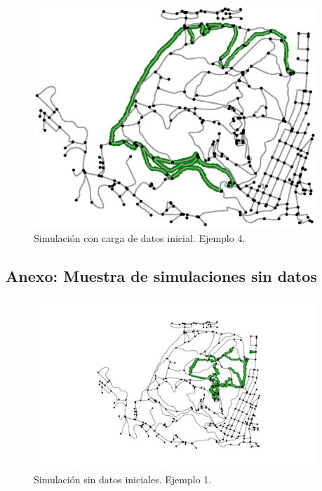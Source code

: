 \begin{figure}[h]
\begin{center}
\includegraphics[width=0.95\textwidth]{./Imagenes/data-simulation/simulated_track_e13e6d56-9096-476d-b7e0-c48ec00bd04a.eps}
\caption{Simulación con carga de datos inicial. Ejemplo 4.}
\end{center}
\label{figure:Simulation4}
\end{figure}
\newpage

\subsection{Anexo: Muestra de simulaciones sin datos} 
\label{subseciton:SimulationSample}\begin{figure}[h]
\begin{center}
\includegraphics[width=0.95\textwidth]{./Imagenes/empty-simulation/track1.png}
\caption{Simulación sin datos iniciales. Ejemplo 1.}
\end{center}
\label{figure:Simulation1}
\end{figure}

